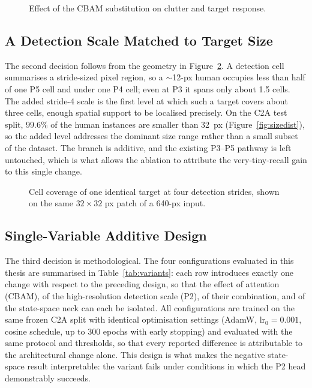 \documentclass[12pt,a4paper,oneside]{report}
\begin{document}
\begin{figure}[tbp]
  \centering
  \caption{Effect of the CBAM substitution on clutter and target response.}
  \label{fig:cbameffect}
\end{figure}

\subsection{A Detection Scale Matched to Target Size}
\label{sec:p2novel}
The second decision follows from the geometry in Figure~\ref{fig:strideprob}. A
detection cell summarises a stride-sized pixel region, so a $\sim$12-px human
occupies less than half of one P5 cell and under one P4 cell; even at P3 it spans
only about 1.5 cells. The added stride-4 scale is the first level at which such a
target covers about three cells, enough spatial support to be localised
precisely. On the C2A test split, $99.6\%$ of the human instances are smaller
than 32~px (Figure~\ref{fig:sizedist}), so the added level addresses the
dominant size range rather than a small subset of the dataset. The
branch is additive, and the existing P3--P5 pathway is left untouched, which is
what allows the ablation to attribute the very-tiny-recall gain to this single
change.

\begin{figure}[tbp]
  \centering
  \caption[Cell coverage of one target at four detection strides.]{Cell coverage
  of one identical target at four detection strides, shown on the same
  $32 \times 32$ px patch of a 640-px input.}
  \label{fig:strideprob}
\end{figure}

\subsection{Single-Variable Additive Design}
The third decision is methodological. The four configurations evaluated in this
thesis are summarised in Table~\ref{tab:variants}: each row introduces exactly
one change with respect to the preceding design, so that the effect of attention
(CBAM), of the high-resolution detection scale (P2), of their combination, and
of the state-space neck can each be isolated. All configurations are trained on
the same frozen C2A split with identical optimisation settings (AdamW,
$\text{lr}_0 = 0.001$, cosine schedule, up to 300 epochs with early stopping)
and evaluated with the same protocol and thresholds, so that every reported
difference is attributable to the architectural change alone. This design is
what makes the negative state-space result interpretable: the variant fails
under conditions in which the P2 head demonstrably succeeds.
\end{document}
